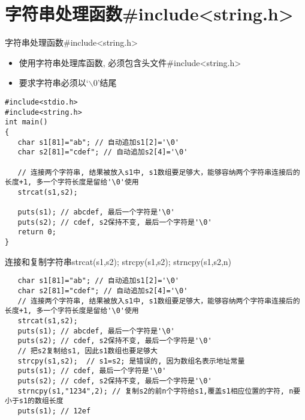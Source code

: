 
\section{字符串处理函数\#include<string.h>}

\begin{frame}{字符串处理函数\#include<string.h>}
\vspace{-0.2cm}
\begin{itemize}
	\item 使用字符串处理库函数, 必须包含头文件\#include<string.h>
	\item 要求字符串必须以`$\backslash$0'结尾
\end{itemize}
\vspace{-0.2cm}
\begin{lstlisting}
#include<stdio.h>
#include<string.h>
int main()
{
   char s1[81]="ab"; // 自动追加s1[2]='\0'
   char s2[81]="cdef"; // 自动追加s2[4]='\0'
   
   // 连接两个字符串, 结果被放入s1中, s1数组要足够大，能够容纳两个字符串连接后的长度+1, 多一个字符长度是留给'\0'使用
   strcat(s1,s2); 
   
   puts(s1); // abcdef, 最后一个字符是'\0'
   puts(s2); // cdef, s2保持不变, 最后一个字符是'\0'
   return 0;
}
\end{lstlisting}
\end{frame}


\begin{frame}{\small{连接和复制字符串strcat(s1,s2); strcpy(s1,s2); strncpy(s1,s2,n)}}
\vspace{-0.3cm}
\begin{lstlisting}
   char s1[81]="ab"; // 自动追加s1[2]='\0'
   char s2[81]="cdef"; // 自动追加s2[4]='\0'
   // 连接两个字符串, 结果被放入s1中, s1数组要足够大，能够容纳两个字符串连接后的长度+1, 多一个字符长度是留给'\0'使用
   strcat(s1,s2); 
   puts(s1); // abcdef, 最后一个字符是'\0'
   puts(s2); // cdef, s2保持不变, 最后一个字符是'\0'
   // 把s2复制给s1, 因此s1数组也要足够大
   strcpy(s1,s2);  // s1=s2; 是错误的, 因为数组名表示地址常量
   puts(s1); // cdef, 最后一个字符是'\0'
   puts(s2); // cdef, s2保持不变, 最后一个字符是'\0'
   strncpy(s1,"1234",2); // 复制s2的前n个字符给s1,覆盖s1相应位置的字符, n要小于s1的数组长度
   puts(s1); // 12ef
\end{lstlisting}
\end{frame}

